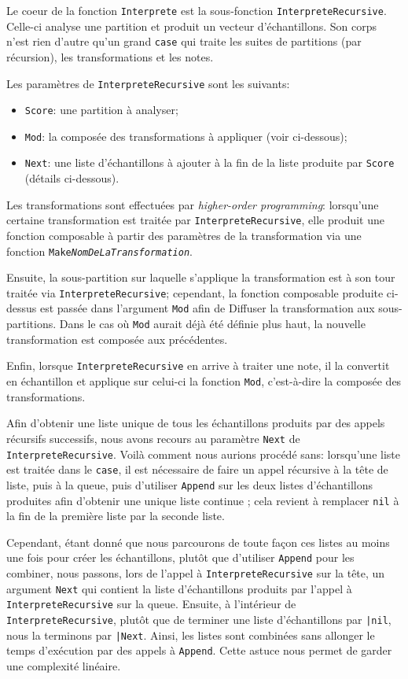 \documentclass[a4paper,12pt]{article}
\begin{document}
Le coeur de la fonction \texttt{Interprete} est la sous-fonction \texttt{InterpreteRecursive}. Celle-ci analyse une partition et produit un vecteur d'échantillons. Son corps n'est rien d'autre qu'un grand \texttt{case} qui traite les suites de partitions (par récursion), les transformations et les notes.

Les paramètres de \texttt{InterpreteRecursive} sont les suivants:
\begin{itemize}
    \item \texttt{Score}: une partition à analyser;
    \item \texttt{Mod}: la composée des transformations à appliquer (voir ci-dessous);
    \item \texttt{Next}: une liste d'échantillons à ajouter à la fin de la liste produite par \texttt{Score} (détails ci-dessous).
\end{itemize}

Les transformations sont effectuées par \emph{higher-order programming}: lorsqu'une certaine transformation est traitée par \texttt{InterpreteRecursive}, elle produit une fonction composable à partir des paramètres de la transformation via une fonction \texttt{Make\textit{NomDeLaTransformation}}.

Ensuite, la sous-partition sur laquelle s'applique la transformation est à son tour traitée via \texttt{InterpreteRecursive}; cependant, la fonction composable produite ci-dessus est passée dans l'argument \texttt{Mod} afin de \og{}Diffuser\fg{} la transformation aux sous-partitions. Dans le cas où \texttt{Mod} aurait déjà été définie plus haut, la nouvelle transformation est composée aux précédentes.

Enfin, lorsque \texttt{InterpreteRecursive} en arrive à traiter une note, il la convertit en échantillon et applique sur celui-ci la fonction \texttt{Mod}, c'est-à-dire la composée des transformations.

Afin d'obtenir une liste unique de tous les échantillons produits par des appels récursifs successifs, nous avons recours au paramètre \texttt{Next} de \texttt{InterpreteRecursive}. Voilà comment nous aurions procédé sans: lorsqu'une liste est traitée dans le \texttt{case}, il est nécessaire de faire un appel récursive à la tête de liste, puis à la queue, puis d'utiliser \texttt{Append} sur les deux listes d'échantillons produites afin d'obtenir une unique liste continue ; cela revient à remplacer \texttt{nil} à la fin de la première liste par la seconde liste.

Cependant, étant donné que nous parcourons de toute façon ces listes au moins une fois pour créer les échantillons, plutôt que d'utiliser \texttt{Append} pour les combiner, nous passons, lors de l'appel à \texttt{InterpreteRecursive} sur la tête, un argument \texttt{Next} qui contient la liste d'échantillons produits par l'appel à \texttt{InterpreteRecursive} sur la queue. Ensuite, à l'intérieur de \texttt{InterpreteRecursive}, plutôt que de terminer une liste d'échantillons par \texttt{|nil}, nous la terminons par \texttt{|Next}. Ainsi, les listes sont combinées sans allonger le temps d'exécution par des appels à \texttt{Append}. Cette astuce nous permet de garder une complexité linéaire.
\end{document}

